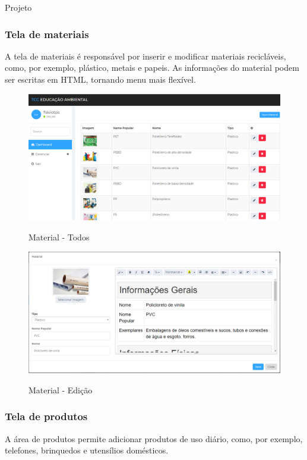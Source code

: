\documentclass[
	12pt,				%
	openright,			%
	twoside,			%
	a4paper,			%
	english,			%
	french,				%
	spanish,			%
	brazil				%
	]{abntex2}
\begin{document}
\begin{chapter}{Projeto}
\subsubsection{Tela de materiais} \label{tela_material}
A tela de materiais é responsável por inserir e modificar materiais recicláveis, como, por exemplo, plástico, metais e papeis. As informações do material podem ser escritas em HTML, tornando menu mais flexível.
\begin{figure}[h]
\centering
   \caption{Material - Todos}
   \includegraphics[scale=0.45]{media/tela_material_site_1.png}
     \label{fig:tela_material_site_1}
\end{figure}

\begin{figure}[h]
\centering
   \caption{Material - Edição}
   \includegraphics[scale=0.40]{media/tela_material_site_2.png}
     \label{fig:tela_material_site_2}
\end{figure}

\newpage
\subsubsection{Tela de produtos} \label{tela_produtos}
A área de produtos permite adicionar produtos de uso diário, como, por exemplo, telefones, brinquedos e utensílios domésticos. 


\end{chapter}
\end{document}
